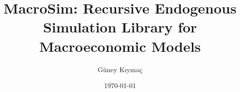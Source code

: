 \documentclass[11pt]{article}
\begin{document}
    \title{MacroSim: Recursive Endogenous Simulation Library for Macroeconomic Models}
    \author{Güney Kıymaç}
    \date{\today}
    \maketitle

    \newpage
    \begingroup
    \hypersetup{hidelinks}
    \tableofcontents
    \endgroup

    \newpage
    

    \newpage
    

    \newpage
    

    \newpage
    

    \newpage
    

    \newpage
    
\end{document}
